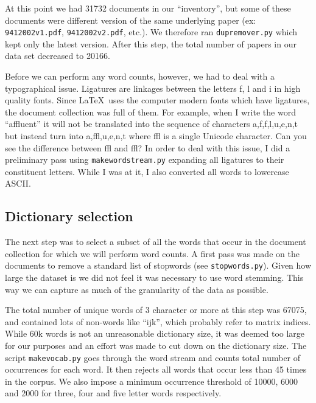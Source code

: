 \documentclass[11pt]{article}
\newcommand{\file}[1]{\texttt{#1}}
\newcommand{\program}[1]{\texttt{#1}}
\begin{document}
        At this point we had 31732 documents in our ``inventory'', but some of these documents
        were different version of the same underlying paper (ex: \file{9412002v1.pdf},
        \file{9412002v2.pdf}, etc.).
        We therefore ran \program{dupremover.py} which kept only the latest version.
        After this step, the total number of papers in our data set decreased to 20166.

        Before we can perform any word counts, however, we had to deal with a typographical issue.
        Ligatures are linkages between the letters f, l and i in high quality fonts.
        Since \LaTeX \ uses the computer modern fonts which have ligatures, the document collection
        was full of them. For example, when I write the word ``affluent'' it will not be translated
        into the sequence of characters a,f,f,l,u,e,n,t but instead turn into a,ffl,u,e,n,t where 
        ffl is a single Unicode character. Can you see the difference between ffl and f{}f{}l?
        In order to deal with this issue, I did a preliminary pass using \program{makewordstream.py}
        expanding all ligatures to their constituent letters. 
        While I was at it, I also converted all words to lowercase ASCII.
		  

    \subsection{Dictionary selection}

        The next step was to select a subset of all the words that occur in the document collection
        for which we will perform word counts.
		A first pass was made on the documents to remove a standard list of stopwords (see
        \file{stopwords.py}). 
		Given how large the dataset is we did not feel it was necessary to use word stemming.
        This way we can capture as much of the granularity of the data as possible.

        The total number of unique words of 3 character or more at this step was 67075, and
        contained lots of non-words like ``ijk'', which probably refer to matrix indices.
        While 60k words is not an unreasonable dictionary size, it was deemed too large for
        our purposes and an effort was made to cut down on the dictionary size.
        The script \program{makevocab.py} goes through the word stream and counts total
        number of occurrences for each word. It then rejects all words that occur less than
        45 times in the corpus. 
        We also impose a minimum occurrence threshold of 10000, 6000 and 2000 for three, four and
        five letter words respectively.
\end{document}

